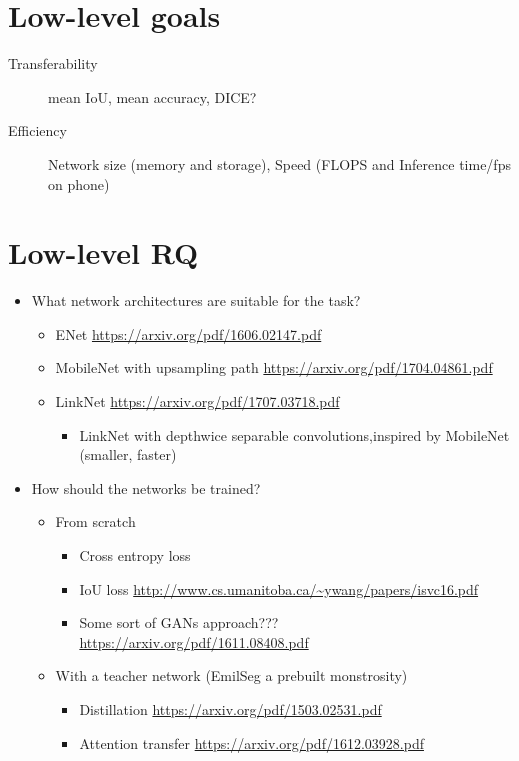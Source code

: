 \documentclass[11pt]{article}
\begin{document}
\section{Low-level goals}
\label{sec:org4d7a48d}
\begin{description}
\item[{Transferability}] mean IoU, mean accuracy, DICE?
\item[{Efficiency}] Network size (memory and storage), Speed (FLOPS and Inference time/fps on phone)
\end{description}

\section{Low-level RQ}
\label{sec:org9d817ff}
\begin{itemize}
\item What network architectures are suitable for the task?
\begin{itemize}
\item ENet \url{https://arxiv.org/pdf/1606.02147.pdf}
\item MobileNet with upsampling path \url{https://arxiv.org/pdf/1704.04861.pdf}
\item LinkNet \url{https://arxiv.org/pdf/1707.03718.pdf}
\begin{itemize}
\item LinkNet with depthwice separable convolutions,inspired by MobileNet (smaller, faster)
\end{itemize}
\end{itemize}
\item How should the networks be trained?
\begin{itemize}
\item From scratch
\begin{itemize}
\item Cross entropy loss
\item IoU loss \url{http://www.cs.umanitoba.ca/\~ywang/papers/isvc16.pdf}
\item Some sort of GANs approach??? \url{https://arxiv.org/pdf/1611.08408.pdf}
\end{itemize}
\item With a teacher network (EmilSeg a prebuilt monstrosity)
\begin{itemize}
\item Distillation \url{https://arxiv.org/pdf/1503.02531.pdf}
\item Attention transfer \url{https://arxiv.org/pdf/1612.03928.pdf}

\end{itemize}
\end{itemize}
\end{itemize}
\end{document}
